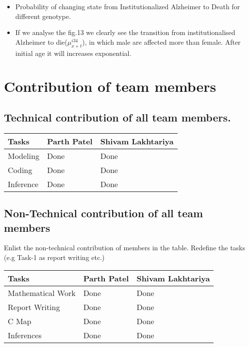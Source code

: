 \documentclass{article}
\begin{document}
\begin{itemize}
    \newline
    \newline
    \item Probability of changing state from Institutionalized Alzheimer to Death for different genotype.
    \item If we analyse the fig.13 we clearly see the transition from institutionalised  Alzheimer to die($\mu_{x+t}^{i34}$), in which male are affected more than female. After initial age it will increases exponential.    
\end{itemize}

\section{ Contribution of team members}	



\subsection{Technical contribution of all team members. }
\begin{table}[h]
\centering
\begin{tabular}{|l|l|l|}
\hline
Tasks  & Parth Patel & Shivam Lakhtariya \\ \hline
Modeling &    Done           &    Done          \\ \hline
Coding &    Done           &    Done      \\ \hline
Inference &    Done           &    Done          \\ \hline
\end{tabular}
\end{table}
\subsection{Non-Technical contribution of all team members }
Enlist the non-technical contribution of members in the table. Redefine the tasks (e.g Task-1 as report writing etc.)
\begin{table}[h]
\centering
\begin{tabular}{|l|l|l|}
\hline
Tasks  & Parth Patel & Shivam Lakhtariya\\ \hline
Mathematical Work &    Done           &    Done          \\ \hline
Report Writing &    Done           &    Done          \\ \hline
C Map &    Done           &    Done          \\ \hline
Inferences & Done  & Done       \\ \hline
\end{tabular}
\end{table}



\end{document}
